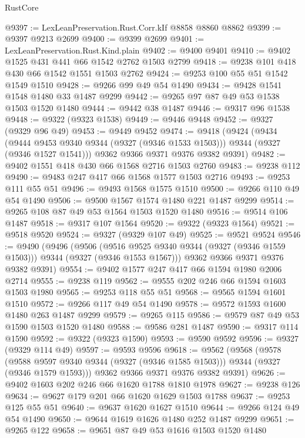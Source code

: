 \begin{lexlean}{RustCore}
\begin{coremodule}
@9397 := LexLeanPreservation.Rust.Corr.kIf @8858 @8860 @8862
@9399 := @9397 @9213 @2699
@9400 := @9399 @2699
@9401 := LexLeanPreservation.Rust.Kind.plain
@9402 := @9400 @9401
@9410 := @9402 @1525 @431 @441 @66 @1542 @2762 @1503 @2799
@9418 := @9238 @101 @418 @430 @66 @1542 @1551 @1503 @2762
@9424 := @9253 @100 @55 @51 @1542 @1549 @1510
@9428 := @9266 @99 @49 @54 @1490
@9434 := @9428 @1541 @1548 @1480 @33 @1487 @9299
@9442 := @9265 @97 @87 @49 @53 @1538 @1503 @1520 @1480
@9444 := @9442 @38 @1487
@9446 := @9317 @96 @1538
@9448 := @9322 (@9323 @1538)
@9449 := @9446 @9448
@9452 := @9327 (@9329 @96 @49)
@9453 := @9449 @9452
@9474 := @9418
    (@9424
      (@9434
        (@9444 @9453 @9340 @9344 (@9327 (@9346 @1533 @1503)))
        @9344
        (@9327 (@9346 @1527 @1541)))
      @9362
      @9366
      @9371
      @9376
      @9382
      @9391)
@9482 := @9402 @1551 @418 @430 @66 @1568 @2716 @1503 @2760
@9483 := @9238 @112
@9490 := @9483 @247 @417 @66 @1568 @1577 @1503 @2716
@9493 := @9253 @111 @55 @51
@9496 := @9493 @1568 @1575 @1510
@9500 := @9266 @110 @49 @54 @1490
@9506 := @9500 @1567 @1574 @1480 @221 @1487 @9299
@9514 := @9265 @108 @87 @49 @53 @1564 @1503 @1520 @1480
@9516 := @9514 @106 @1487
@9518 := @9317 @107 @1564
@9520 := @9322 (@9323 @1564)
@9521 := @9518 @9520
@9524 := @9327 (@9329 @107 @49)
@9525 := @9521 @9524
@9546 := @9490
    (@9496
      (@9506
        (@9516 @9525 @9340 @9344 (@9327 (@9346 @1559 @1503)))
        @9344
        (@9327 (@9346 @1553 @1567)))
      @9362
      @9366
      @9371
      @9376
      @9382
      @9391)
@9554 := @9402 @1577 @247 @417 @66 @1594 @1980 @2006 @2714
@9555 := @9238 @119
@9562 := @9555 @202 @246 @66 @1594 @1603 @1503 @1980
@9565 := @9253 @118 @55 @51
@9568 := @9565 @1594 @1601 @1510
@9572 := @9266 @117 @49 @54 @1490
@9578 := @9572 @1593 @1600 @1480 @263 @1487 @9299
@9579 := @9265 @115
@9586 := @9579 @87 @49 @53 @1590 @1503 @1520 @1480
@9588 := @9586 @281 @1487
@9590 := @9317 @114 @1590
@9592 := @9322 (@9323 @1590)
@9593 := @9590 @9592
@9596 := @9327 (@9329 @114 @49)
@9597 := @9593 @9596
@9618 := @9562
    (@9568
      (@9578
        (@9588 @9597 @9340 @9344 (@9327 (@9346 @1585 @1503)))
        @9344
        (@9327 (@9346 @1579 @1593)))
      @9362
      @9366
      @9371
      @9376
      @9382
      @9391)
@9626 := @9402 @1603 @202 @246 @66 @1620 @1788 @1810 @1978
@9627 := @9238 @126
@9634 := @9627 @179 @201 @66 @1620 @1629 @1503 @1788
@9637 := @9253 @125 @55 @51
@9640 := @9637 @1620 @1627 @1510
@9644 := @9266 @124 @49 @54 @1490
@9650 := @9644 @1619 @1626 @1480 @252 @1487 @9299
@9651 := @9265 @122
@9658 := @9651 @87 @49 @53 @1616 @1503 @1520 @1480

\end{coremodule}
\end{lexlean}
